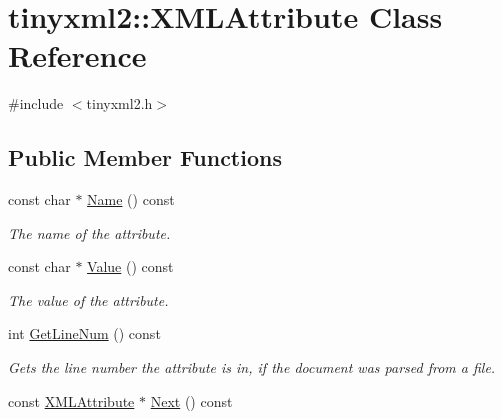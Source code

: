 \hypertarget{classtinyxml2_1_1XMLAttribute}{}\section{tinyxml2\+::X\+M\+L\+Attribute Class Reference}
\label{classtinyxml2_1_1XMLAttribute}


{\ttfamily \#include $<$tinyxml2.\+h$>$}

\subsection*{Public Member Functions}
\begin{DoxyCompactItemize}
\item 
\mbox{\label{classtinyxml2_1_1XMLAttribute_ab886c486ec19f02ed826f8dc129e5ad8}} 
const char $\ast$ \mbox{\hyperlink{classtinyxml2_1_1XMLAttribute_ab886c486ec19f02ed826f8dc129e5ad8}{Name}} () const
\begin{DoxyCompactList}\small\item\em The name of the attribute. \end{DoxyCompactList}\item 
\mbox{\label{classtinyxml2_1_1XMLAttribute_a1aab1dd0e43ecbcfa306adbcf3a3d853}} 
const char $\ast$ \mbox{\hyperlink{classtinyxml2_1_1XMLAttribute_a1aab1dd0e43ecbcfa306adbcf3a3d853}{Value}} () const
\begin{DoxyCompactList}\small\item\em The value of the attribute. \end{DoxyCompactList}\item 
\mbox{\label{classtinyxml2_1_1XMLAttribute_a02d5ea924586e35f9c13857d1671b765}} 
int \mbox{\hyperlink{classtinyxml2_1_1XMLAttribute_a02d5ea924586e35f9c13857d1671b765}{Get\+Line\+Num}} () const
\begin{DoxyCompactList}\small\item\em Gets the line number the attribute is in, if the document was parsed from a file. \end{DoxyCompactList}\item 
\mbox{\label{classtinyxml2_1_1XMLAttribute_aee53571b21e7ce5421eb929523a8bbe6}} 
const \mbox{\hyperlink{classtinyxml2_1_1XMLAttribute}{X\+M\+L\+Attribute}} $\ast$ \mbox{\hyperlink{classtinyxml2_1_1XMLAttribute_aee53571b21e7ce5421eb929523a8bbe6}{Next}} () const

\end{DoxyCompactItemize}
